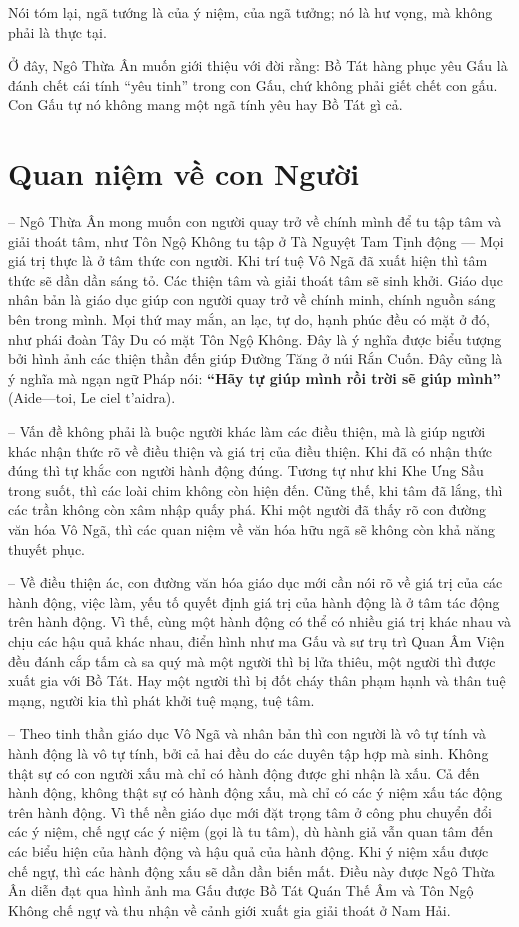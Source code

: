 Nói tóm lại, ngã tướng là của ý niệm, của ngã tưởng; nó là hư vọng, mà không phải là thực tại.

Ở đây, Ngô Thừa Ân muốn giới thiệu với đời rằng: Bồ Tát hàng phục yêu Gấu là đánh chết cái tính ``yêu tinh'' trong con Gấu, chứ không phải giết chết con gấu. Con Gấu tự nó không mang một ngã tính yêu hay Bồ Tát gì cả.


\section{Quan niệm về con Người} %
\label{sec:15_con_nguoi}

-- Ngô Thừa Ân mong muốn con người quay trở về chính mình để tu tập tâm và giải thoát tâm, như Tôn Ngộ Không tu tập ở Tà Nguyệt Tam Tịnh động --- Mọi giá trị thực là ở tâm thức con người. Khi trí tuệ Vô Ngã đã xuất hiện thì tâm thức sẽ dần dần sáng tỏ. Các thiện tâm và giải thoát tâm sẽ sinh khởi. Giáo dục nhân bản là giáo dục giúp con người quay trở về chính minh, chính nguồn sáng bên trong mình. Mọi thứ may mắn, an lạc, tự do, hạnh phúc đều có mặt ở đó, như phái đoàn Tây Du có mặt Tôn Ngộ Không. Đây là ý nghĩa được biểu tượng bởi hình ảnh các thiện thần đến giúp Đường Tăng ở núi Rắn Cuốn. Đây cũng là ý nghĩa mà ngạn ngữ Pháp nói: {\bf ``Hãy tự giúp mình rồi trời sẽ giúp mình''} (Aide---toi, Le ciel t'aidra).

-- Vấn đề không phải là buộc người khác làm các điều thiện, mà là giúp người khác nhận thức rõ về điều thiện và giá trị của điều thiện. Khi đã có nhận thức đúng thì tự khắc con người hành động đúng. Tương tự như khi Khe Ưng Sầu trong suốt, thì các loài chim không còn hiện đến. Cũng thế, khi tâm đã lắng, thì các trần không còn xâm nhập quấy phá. Khi một người đã thấy rõ con đường văn hóa Vô Ngã, thì các quan niệm về văn hóa hữu ngã sẽ không còn khả năng thuyết phục.

-- Về điều thiện ác, con đường văn hóa giáo dục mới cần nói rõ về giá trị của các hành động, việc làm, yếu tố quyết định giá trị của hành động là ở tâm tác động trên hành động. Vì thế, cùng một hành động có thể có nhiều giá trị khác nhau và chịu các hậu quả khác nhau, điển hình như ma Gấu và sư trụ trì Quan Âm Viện đều đánh cắp tấm cà sa quý mà một người thì bị lửa thiêu, một người thì được xuất gia với Bồ Tát. Hay một người thì bị đốt cháy thân phạm hạnh và thân tuệ mạng, người kia thì phát khởi tuệ mạng, tuệ tâm.

-- Theo tinh thần giáo dục Vô Ngã và nhân bản thì con người là vô tự tính và hành động là vô tự tính, bởi cả hai đều do các duyên tập hợp mà sinh. Không thật sự có con người xấu mà chỉ có hành động được ghi nhận là xấu. Cả đến hành động, không thật sự có hành động xấu, mà chỉ có các ý niệm xấu tác động trên hành động. Vì thế nền giáo dục mới đặt trọng tâm ở công phu chuyển đổi các ý niệm, chế ngự các ý niệm (gọi là tu tâm), dù hành giả vẫn quan tâm đến các biểu hiện của hành động và hậu quả của hành động. Khi ý niệm xấu được chế ngự, thì các hành động xấu sẽ dần dần biến mất. Điều này được Ngô Thừa Ân diễn đạt qua hình ảnh ma Gấu được Bồ Tát Quán Thế Âm và Tôn Ngộ Không chế ngự và thu nhận về cảnh giới xuất gia giải thoát ở Nam Hải.


